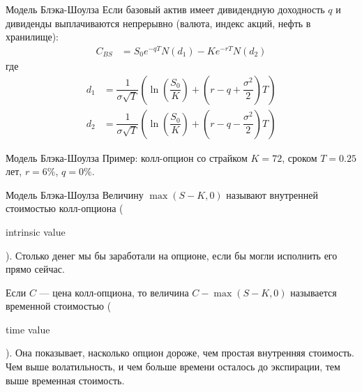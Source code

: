 \documentclass{beamer}
\newcommand{\en}[1]{\begin{otherlanguage}{english}#1\end{otherlanguage}}
\begin{document}
\begin{frame}{Модель Блэка-Шоулза}
\justify
Если базовый актив имеет дивидендную доходность $q$  и дивиденды выплачиваются непрерывно (валюта, индекс акций, нефть в хранилище):
\begin{align*}
C_{BS} &= S_0e^{-qT}N(d_1) - Ke^{-rT}N(d_2)
\end{align*}
где
\begin{align*}
d_1 &= \dfrac{1}{\sigma\sqrt{T}}\left( \ln\left(\dfrac{S_0}{K}\right) + \left(r -q + \dfrac{\sigma^2}{2}\right)T\right) \\
d_2 &= \dfrac{1}{\sigma\sqrt{T}}\left( \ln\left(\dfrac{S_0}{K}\right) + \left(r -q- \dfrac{\sigma^2}{2}\right)T\right)
\end{align*}
\end{frame}



\begin{frame}{Модель Блэка-Шоулза}
\justify
Пример: колл-опцион со страйком $K=72$, сроком $T=0.25$ лет, $r=6\%$, $q=0\%$.

\centering
{}
\end{frame}



\begin{frame}{Модель Блэка-Шоулза}
\justify
Величину $\max(S - K, 0)$ называют внутренней стоимостью колл-опциона (\en{intrinsic value}). Столько денег мы бы заработали на опционе, если бы могли исполнить его прямо сейчас.

\justify
Если $C$ --- цена колл-опциона, то величина $C - \max(S - K, 0)$ называется временной стоимостью (\en{time value}). Она показывает, насколько опцион дороже, чем простая внутренняя стоимость. Чем выше волатильность, и чем больше времени осталось до экспирации, тем выше временная стоимость.
\end{frame}
\end{document}
